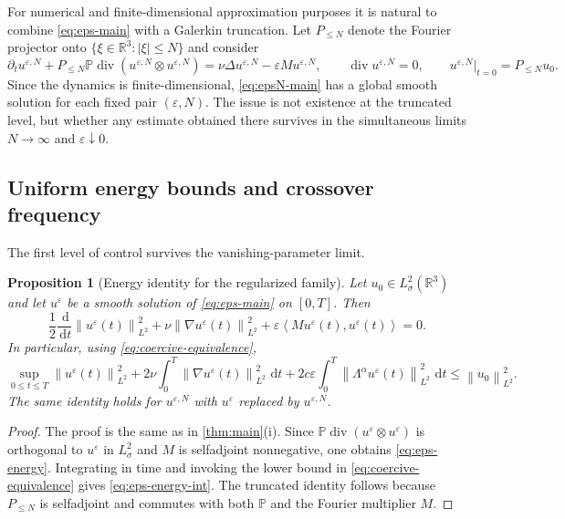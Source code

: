 \documentclass[11pt]{article}
\newtheorem{proposition}[theorem]{Proposition}
\theoremstyle{definition}
\theoremstyle{remark}
\newcommand{\R}{\mathbb{R}}
\newcommand{\Pcal}{\mathbb{P}}
\newcommand{\dd}{\,\mathrm{d}}
\newcommand{\ip}[2]{\left\langle #1,#2\right\rangle}
\newcommand{\norm}[1]{\left\lVert #1\right\rVert}
\newcommand{\diver}{\operatorname{div}}
\begin{document}
For numerical and finite-dimensional approximation purposes it is natural to combine \eqref{eq:eps-main} with a Galerkin truncation. Let $P_{\le N}$ denote the Fourier projector onto $\{\xi\in\R^3:|\xi|\le N\}$ and consider
\begin{equation}\label{eq:epsN-main}
\partial_t u^{\varepsilon,N}
+P_{\le N}\Pcal\diver(u^{\varepsilon,N}\otimes u^{\varepsilon,N})
=\nu\Delta u^{\varepsilon,N}-\varepsilon M u^{\varepsilon,N},
\qquad \diver u^{\varepsilon,N}=0,
\qquad u^{\varepsilon,N}|_{t=0}=P_{\le N}u_0.
\end{equation}
Since the dynamics is finite-dimensional, \eqref{eq:epsN-main} has a global smooth solution for each fixed pair $(\varepsilon,N)$. The issue is not existence at the truncated level, but whether any estimate obtained there survives in the simultaneous limits $N\to\infty$ and $\varepsilon\downarrow0$.

\subsection{Uniform energy bounds and crossover frequency}

The first level of control survives the vanishing-parameter limit.

\begin{proposition}[Energy identity for the regularized family]\label{prop:eps-energy}
Let $u_0\in L^2_\sigma(\R^3)$ and let $u^\varepsilon$ be a smooth solution of \eqref{eq:eps-main} on $[0,T]$. Then
\begin{equation}\label{eq:eps-energy}
\frac12\frac{\dd}{\dd t}\norm{u^\varepsilon(t)}_{L^2}^2
+\nu\norm{\nabla u^\varepsilon(t)}_{L^2}^2
+\varepsilon\ip{M u^\varepsilon(t)}{u^\varepsilon(t)}=0.
\end{equation}
In particular, using \eqref{eq:coercive-equivalence},
\begin{equation}\label{eq:eps-energy-int}
\sup_{0\le t\le T}\norm{u^\varepsilon(t)}_{L^2}^2
+2\nu\int_0^T\norm{\nabla u^\varepsilon(t)}_{L^2}^2\,\dd t
+2c\varepsilon\int_0^T\norm{\Lambda^\alpha u^\varepsilon(t)}_{L^2}^2\,\dd t
\le \norm{u_0}_{L^2}^2.
\end{equation}
The same identity holds for $u^{\varepsilon,N}$ with $u^\varepsilon$ replaced by $u^{\varepsilon,N}$.
\end{proposition}

\begin{proof}
The proof is the same as in \cref{thm:main}(i). Since $\Pcal\diver(u^\varepsilon\otimes u^\varepsilon)$ is orthogonal to $u^\varepsilon$ in $L^2_\sigma$ and $M$ is selfadjoint nonnegative, one obtains \eqref{eq:eps-energy}. Integrating in time and invoking the lower bound in \eqref{eq:coercive-equivalence} gives \eqref{eq:eps-energy-int}. The truncated identity follows because $P_{\le N}$ is selfadjoint and commutes with both $\Pcal$ and the Fourier multiplier $M$.
\end{proof}
\end{document}
